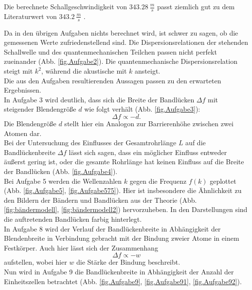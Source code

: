 Die berechnete Schallgeschwindigkeit von $\SI{343.28}{\frac{m}{s}}$ passt ziemlich gut zu dem Literaturwert von $\SI{343.2}{\frac{m}{s}}$ \cite{Physik}.

Da in den übrigen Aufgaben nichts berechnet wird, ist schwer zu sagen, ob die gemessenen Werte zufriedenstellend sind.
Die Dispersionsrelationen der stehenden Schallwelle und des quantenmechanischen Teilchen passen nicht perfekt zueinander (Abb. \ref{fig.Aufgabe2}).
Die quantenmechanische Dispersionsrelation steigt mit $k^2$, während die akustische mit $k$ ansteigt.\\
Die aus den Aufgaben resultierenden Aussagen passen zu den erwarteten Ergebnissen.
\\In Aufgabe 3 wird deutlich, dass sich die Breite der Bandlücken $\Delta f$ mit steigender Blendengröße $d$ wie folgt verhält (Abb. \ref{fig.Aufgabe3}):
\begin{equation*}
  \Delta f \propto - d.
\end{equation*}
Die Blendengröße $d$ stellt hier ein Analogon zur Barrierenhöhe zwischen zwei Atomen dar.
\\Bei der Untersuchung des Einflusses der Gesamtrohrlänge $L$ auf die Bandlückenbreite $\Delta f$ lässt sich sagen, dass ein möglicher Einfluss entweder äußerst gering ist, oder die gesamte Rohrlänge hat keinen Einfluss auf die Breite der Bandlücken (Abb. \ref{fig.Aufgabe4}).
\\Bei Aufgabe 5 werden die Wellenzahlen $k$ gegen die Frequenz $f(k)$ geplottet (Abb. \ref{fig.Aufgabe5}, \ref{fig.Aufgabe575}).
Hier ist insbesondere die Ähnlichkeit zu den Bildern der Bändern und Bandlücken aus der Theorie (Abb. \ref{fig:bändermodell}, \ref{fig:bändermodell2}) hervorzuheben.
In den Darstellungen sind die auftretenden Bandlücken farbig hinterlegt.
\\In Aufgabe 8 wird der Verlauf der Bandlückenbreite in Abhängigkeit der Blendenbreite in Verbindung gebracht mit der Bindung zweier Atome in einem Festkörper.
Auch hier lässt sich der Zusammenhang
\begin{equation*}
  \Delta f \propto - w
\end{equation*}
aufstellen, wobei hier $w$ die Stärke der Bindung beschreibt.
\\Nun wird in Aufgabe 9 die Bandlückenbreite in Abhängigkeit der Anzahl der Einheitszellen betrachtet (Abb. \ref{fig.Aufgabe9}, \ref{fig.Aufgabe91}, \ref{fig.Aufgabe92}).
